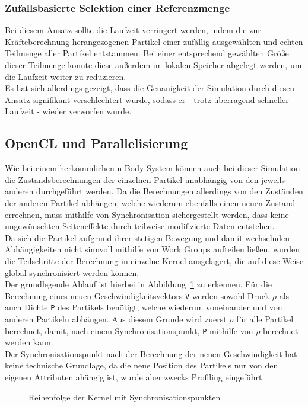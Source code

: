 \subsubsection{Zufallsbasierte Selektion einer Referenzmenge}
Bei diesem Ansatz sollte die Laufzeit verringert werden, indem die zur Kräfteberechnung herangezogenen Partikel einer zufällig ausgewählten und echten Teilmenge aller Partikel entstammen. Bei einer entsprechend gewählten Größe dieser Teilmenge konnte diese außerdem im lokalen Speicher abgelegt werden, um die Laufzeit weiter zu reduzieren.\\
Es hat sich allerdings gezeigt, dass die Genauigkeit der Simulation durch diesen Ansatz signifikant verschlechtert wurde, sodass er - trotz überragend schneller Laufzeit - wieder verworfen wurde.
\subsection{OpenCL und Parallelisierung}
Wie bei einem herkömmlichen n-Body-System können auch bei dieser Simulation die Zustandsberechnungen der einzelnen Partikel unabhängig von den jeweils anderen durchgeführt werden. Da die Berechnungen allerdings von den Zuständen der anderen Partikel abhängen, welche wiederum ebenfalls einen neuen Zustand errechnen, muss mithilfe von Synchronisation sichergestellt werden, dass keine ungewünschten Seiteneffekte durch teilweise modifizierte Daten entstehen.\\
Da sich die Partikel aufgrund ihrer stetigen Bewegung und damit wechselnden Abhängigkeiten nicht sinnvoll mithilfe von Work Groups aufteilen ließen, wurden die Teilschritte der Berechnung in einzelne Kernel ausgelagert, die auf diese Weise global synchronisiert werden können.\\
Der grundlegende Ablauf ist hierbei in Abbildung~\ref{fig:simulation_kernelablauf} zu erkennen. Für die Berechnung eines neuen Geschwindigkeitsvektors \texttt{V} werden sowohl Druck $\rho$  als auch Dichte \texttt{P} des Partikels benötigt, welche wiederum voneinander und von anderen Partikeln abhängen. Aus diesem Grunde wird zuerst $\rho$ für alle Partikel berechnet, damit, nach einem Synchronisationspunkt, \texttt{P} mithilfe von $\rho$ berechnet werden kann. \\
Der Synchronisationspunkt nach der Berechnung der neuen Geschwindigkeit hat keine technische Grundlage, da die neue Position des Partikels nur von den eigenen Attributen ahängig ist, wurde aber zwecks Profiling eingeführt.
\begin{figure}[h]
  \centering
    
  \caption{Reihenfolge der Kernel mit Synchronisationspunkten}
  \label{fig:simulation_kernelablauf}
\end{figure}
